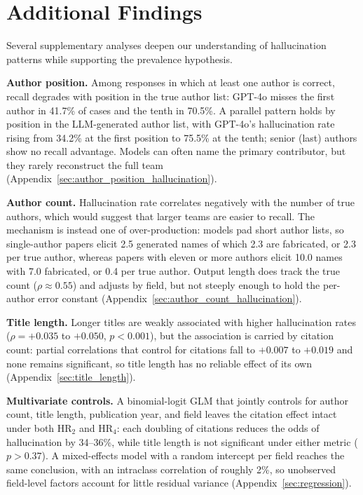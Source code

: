 \documentclass[11pt]{article}
\begin{document}
\section{Additional Findings}
\label{sec:findings}

Several supplementary analyses deepen our understanding of hallucination patterns while supporting the prevalence hypothesis.

\textbf{Author position.} Among responses in which at least one author is correct, recall degrades with position in the true author list: GPT-4o misses the first author in 41.7\% of cases and the tenth in 70.5\%. A parallel pattern holds by position in the LLM-generated author list, with GPT-4o's hallucination rate rising from 34.2\% at the first position to 75.5\% at the tenth; senior (last) authors show no recall advantage. Models can often name the primary contributor, but they rarely reconstruct the full team (Appendix~\ref{sec:author_position_hallucination}).

\textbf{Author count.} Hallucination rate correlates negatively with the number of true authors, which would suggest that larger teams are easier to recall. The mechanism is instead one of over-production: models pad short author lists, so single-author papers elicit 2.5 generated names of which 2.3 are fabricated, or 2.3 per true author, whereas papers with eleven or more authors elicit 10.0 names with 7.0 fabricated, or 0.4 per true author. Output length does track the true count ($\rho \approx 0.55$) and adjusts by field, but not steeply enough to hold the per-author error constant (Appendix~\ref{sec:author_count_hallucination}).

\textbf{Title length.} Longer titles are weakly associated with higher hallucination rates ($\rho = +0.035$ to $+0.050$, $p < 0.001$), but the association is carried by citation count: partial correlations that control for citations fall to $+0.007$ to $+0.019$ and none remains significant, so title length has no reliable effect of its own (Appendix~\ref{sec:title_length}).

\textbf{Multivariate controls.} A binomial-logit GLM that jointly controls for author count, title length, publication year, and field leaves the citation effect intact under both HR$_2$ and HR$_4$: each doubling of citations reduces the odds of hallucination by 34--36\%, while title length is not significant under either metric ($p > 0.37$). A mixed-effects model with a random intercept per field reaches the same conclusion, with an intraclass correlation of roughly 2\%, so unobserved field-level factors account for little residual variance (Appendix~\ref{sec:regression}).
\end{document}
